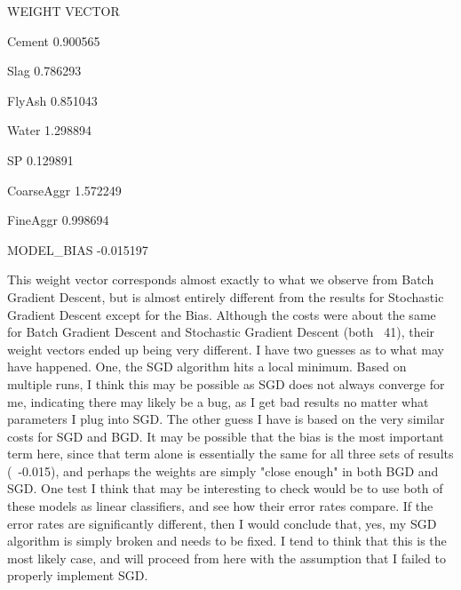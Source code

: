 \documentclass[12pt, fullpage,letterpaper]{article}
\begin{document}
\begin{enumerate}
\begin{enumerate}
\begin{lstlisting}[language=Python, caption=Optimal Weights Function]
	    \end{lstlisting}
		
		WEIGHT VECTOR
		
	    Cement        0.900565
	    
        Slag          0.786293
        
        FlyAsh        0.851043
        
        Water         1.298894
        
        SP            0.129891
        
        CoarseAggr    1.572249
        
        FineAggr      0.998694
        
        MODEL\_BIAS   -0.015197
    
        This weight vector corresponds almost exactly to what we observe from Batch Gradient Descent, but is almost entirely different from the results for Stochastic Gradient Descent except for the Bias. Although the costs were about the same for Batch Gradient Descent and Stochastic Gradient Descent (both ~41), their weight vectors ended up being very different. I have two guesses as to what may have happened. One, the SGD algorithm hits a local minimum. Based on multiple runs, I think this may be possible as SGD does not always converge for me, indicating there may likely be a bug, as I get bad results no matter what parameters I plug into SGD. The other guess I have is based on the very similar costs for SGD and BGD. It may be possible that the bias is the most important term here, since that term alone is essentially the same for all three sets of results (~-0.015), and perhaps the weights are simply "close enough" in both BGD and SGD. One test I think that may be interesting to check would be to use both of these models as linear classifiers, and see how their error rates compare. If the error rates are significantly different, then I would conclude that, yes, my SGD algorithm is simply broken and needs to be fixed. I tend to think that this is the most likely case, and will proceed from here with the assumption that I failed to properly implement SGD.
    
	\end{enumerate}

\end{enumerate}
\end{document}
